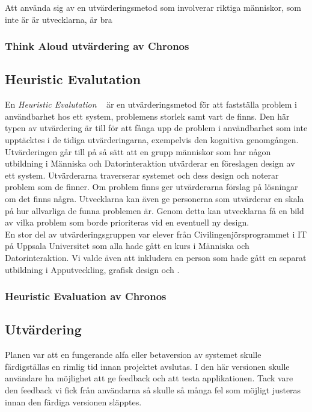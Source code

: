 \documentclass[a4paper, 11pt]{article}
\begin{document}
Att använda sig av en utvärderingsmetod som involverar riktiga människor, som inte är är utvecklarna, är bra 

\subsubsection{Think Aloud utvärdering av Chronos}


\subsection{Heuristic Evalutation}
En \textit{Heuristic Evalutation} ~\cite[sid 228--229]{benyon2010designing} är en utvärderingsmetod för att fastställa problem i användbarhet hos ett system, problemens storlek samt vart de finns. Den här typen av utvärdering är till för att fånga upp de problem i användbarhet som inte upptäcktes i de tidiga utvärderingarna, exempelvis den kognitiva genomgången.
Utvärderingen går till på så sätt att en grupp människor som har någon utbildning i Människa och Datorinteraktion utvärderar en föreslagen design av ett system. Utvärderarna traverserar systemet och dess design och noterar problem som de finner. Om problem finns ger utvärderarna förslag på lösningar om det finns några. Utvecklarna kan även ge personerna som utvärderar en skala på hur allvarliga de funna problemen är. Genom detta kan utvecklarna få en bild av vilka problem som borde prioriteras vid en eventuell ny design.\\
En stor del av utvärderingsgruppen var elever från Civilingenjörsprogrammet i IT på Uppsala Universitet som alla hade gått en kurs i Människa och Datorinteraktion. Vi valde även att inkludera en person som hade gått en separat utbildning i Apputveckling, grafisk design och . 

\subsubsection{Heuristic Evaluation av Chronos}


\subsection{Utvärdering}
Planen var att en fungerande alfa eller betaversion av systemet skulle färdigställas en rimlig tid innan projektet avslutas. I den här versionen skulle användare ha möjlighet att ge feedback och att testa applikationen. Tack vare den feedback vi fick från användarna så skulle så många fel som möjligt justeras innan den färdiga versionen släpptes.
\end{document}
